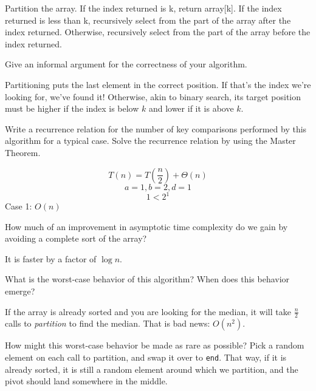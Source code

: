 \documentclass{tufte-handout}
\begin{document}
\begin{questions}
{\color{red} 
Partition the array. 
If the index returned is k, return array[k].
If the index returned is less than k, recursively select from the part of the array after the index returned. Otherwise, recursively select from the part of the array before the index returned.
}


\item Give an informal argument for the correctness of your algorithm.

{\color{red} 
Partitioning puts the last element in the correct position. If that's the index we're looking for, we've found it! Otherwise, akin to binary search, its target position must be higher if the index is below $k$ and lower if it is above $k$.
}

\item Write a recurrence relation for the number of key comparisons performed by this algorithm for a typical case. Solve the recurrence relation by using the Master Theorem.

{\color{red} 
\[ T(n) = T(\frac{n}{2}) + \Theta(n) \]
\[a = 1, b = 2, d = 1\] 
\[1 < 2^1\]
Case 1: $O(n)$
}

\item How much of an improvement in asymptotic time complexity do we gain by avoiding a complete sort of the array?

{\color{red} 
It is faster by a factor of $\log n$.
}

\item What is the worst-case behavior of this algorithm? When does this behavior emerge? 

{\color{red} 
If the array is already sorted and you are looking for the median, it will take $\frac{n}{2}$ calls to \emph{partition} to find the median. That is bad news: $O(n^2)$.
}

\item How might this worst-case behavior be made as rare as possible?
{\color{red}
Pick a random element on each call to partition, and swap it over to \verb+end+. That way, if it is already sorted, it is still a random element around which we partition, and the pivot should land somewhere in the middle.
}

\end{questions}
\end{document}
